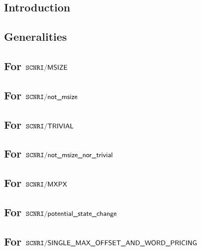 \subsection{Introduction}                                          \label{mxp: computation: intro}                               
\subsection{Generalities}                                          \label{mxp: computation: generalities}                        
\subsection{For $\texttt{SCNRI}\textsf{/}{\textsf{MSIZE}}$}                               \label{mxp: computation: msize}                               
\subsection{For $\texttt{SCNRI}\textsf{/}{\textsf{not\_msize}}$}                         \label{mxp: computation: non msize}                           
\subsection{For $\texttt{SCNRI}\textsf{/}{\textsf{TRIVIAL}}$}                    \label{mxp: computation: trivial}                             
\subsection{For $\texttt{SCNRI}\textsf{/}{\textsf{not\_msize\_nor\_trivial}}$}               \label{mxp: computation: nontrivial}                          
\subsection{For $\texttt{SCNRI}\textsf{/}{\textsf{MXPX}}$}                                \label{mxp: computation: mxpx}                                
\subsection{For $\texttt{SCNRI}\textsf{/}{\textsf{potential\_state\_change}}$}             \label{mxp: computation: nontrivial unexceptional}            
\subsection{For $\texttt{SCNRI}\textsf{/}{\textsf{SINGLE\_MAX\_OFFSET\_AND\_WORD\_PRICING}}$}       \label{mxp: computation: single max offset word}              
